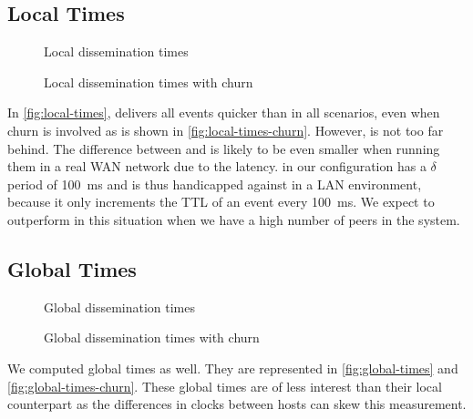 \subsection{Local Times}
\label{sub:local-times}
\begin{figure*}[hpt]
	\centering
	
	\vspace{-2mm} 
	\caption{Local dissemination times}
	\vspace{-2mm}
	\label{fig:local-times} 
\end{figure*}

\begin{figure}[hpt]
	\centering
	
	\vspace{-2mm} 
	\caption{Local dissemination times with churn}
	\vspace{-2mm} 
	\label{fig:local-times-churn} 
\end{figure}
In \autoref{fig:local-times}, \jgroups delivers all events quicker than \epto in all scenarios, even when churn is involved as is shown in \autoref{fig:local-times-churn}. However, \epto is not too far behind. The difference between \epto and \jgroups is likely to be even smaller when running them in a real WAN network due to the latency. \epto in our configuration has a $\delta$ period of \SI{100}{\milli\second} and is thus handicapped against \jgroups in a LAN environment, because it only increments the TTL of an event every \SI{100}{\milli\second}. We expect \epto to outperform \jgroups in this situation when we have a high number of peers in the system.
\subsection{Global Times}
\begin{figure*}[hpt]
	\centering
	
	\vspace{-2mm} 
	\caption{Global dissemination times}
	\vspace{-2mm}
	\label{fig:global-times}  
\end{figure*}

\begin{figure}[hpt]
	\centering
	
	\vspace{-2mm} 
	\caption{Global dissemination times with churn}
	\vspace{-2mm} 
	\label{fig:global-times-churn} 
\end{figure}
We computed global times as well. They are represented in \autoref{fig:global-times} and \autoref{fig:global-times-churn}. These global times are of less interest than their local counterpart as the differences in clocks between hosts can skew this measurement.

